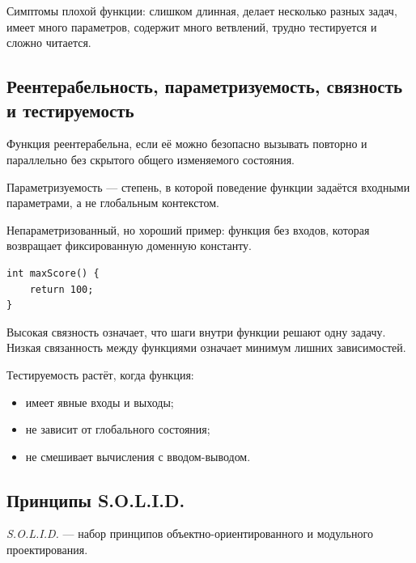 \begin{remark}
Симптомы плохой функции: слишком длинная, делает несколько разных задач, имеет много параметров, содержит много ветвлений, трудно тестируется и сложно читается.
\end{remark}

\subsection{Реентерабельность, параметризуемость, связность и тестируемость}
\begin{definition}
Функция реентерабельна, если её можно безопасно вызывать повторно и параллельно без скрытого общего изменяемого состояния.
\end{definition}

\begin{definition}[Параметризуемость]
Параметризуемость — степень, в которой поведение функции задаётся входными параметрами, а не глобальным контекстом.
\end{definition}

Непараметризованный, но хороший пример: функция без входов, которая возвращает фиксированную доменную константу.
\begin{verbatim}
int maxScore() {
    return 100;
}
\end{verbatim}

Высокая связность означает, что шаги внутри функции решают одну задачу. Низкая связанность между функциями означает минимум лишних зависимостей.

Тестируемость растёт, когда функция:
\begin{itemize}
    \item имеет явные входы и выходы;
    \item не зависит от глобального состояния;
    \item не смешивает вычисления с вводом-выводом.
\end{itemize}

\subsection{Принципы S.O.L.I.D.}
\begin{definition}[S.O.L.I.D.]
\textit{S.O.L.I.D.} — набор принципов объектно-ориентированного и модульного проектирования.
\end{definition}

